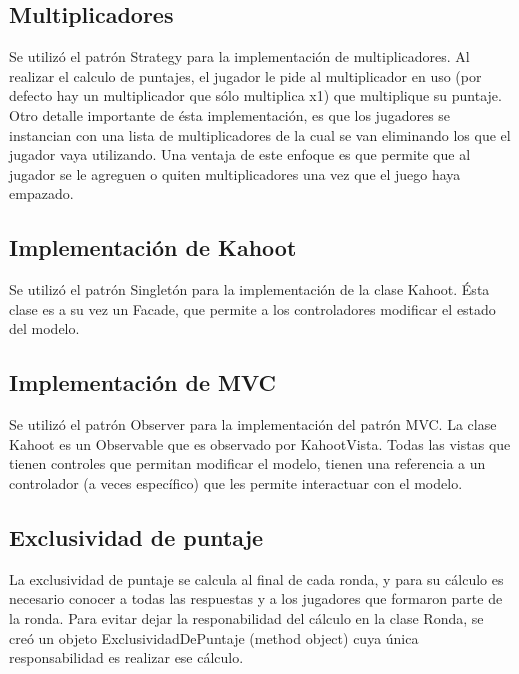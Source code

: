 \documentclass[titlepage,a4paper]{article}
\begin{document}
\subsection{Multiplicadores} Se utilizó el patrón Strategy para la implementación de multiplicadores. Al realizar el calculo de puntajes, el jugador le pide al multiplicador en uso (por defecto hay un multiplicador que sólo multiplica x1) que multiplique su puntaje. Otro detalle importante de ésta implementación, es que los jugadores se instancian con una lista de multiplicadores de la cual se van eliminando los que el jugador vaya utilizando. Una ventaja de \’este enfoque es que permite que al jugador se le agreguen o quiten multiplicadores una vez que el juego haya empazado.

\subsection{Implementación de Kahoot} Se utilizó el patrón Singletón para la implementación de la clase Kahoot. Ésta clase es a su vez un Facade, que permite a los controladores modificar el estado del modelo.
\subsection{Implementación de MVC} Se utilizó el patrón Observer para la implementación del patrón MVC. La clase Kahoot es un Observable que es observado por KahootVista. Todas las vistas que tienen controles que permitan modificar el modelo, tienen una referencia a un controlador (a veces específico) que les permite interactuar con el modelo.
\subsection{Exclusividad de puntaje} La exclusividad de puntaje se calcula al final de cada ronda, y para su cálculo es necesario conocer a todas las respuestas y a los jugadores que formaron parte de la ronda. Para evitar dejar la responabilidad del cálculo en la clase Ronda, se creó un objeto ExclusividadDePuntaje (method object) cuya única responsabilidad es realizar ese cálculo.
\end{document}
